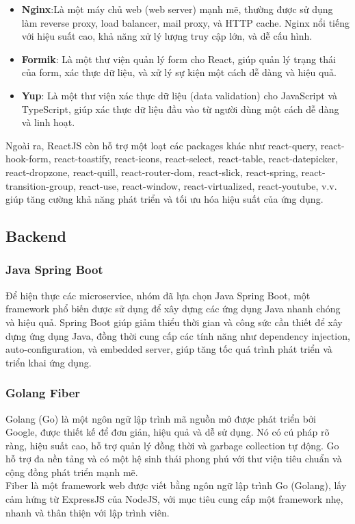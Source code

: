\begin{itemize}
    \item \textbf{Nginx}:Là một máy chủ web (web server) mạnh mẽ, thường được sử dụng làm reverse proxy, load balancer, mail proxy, và HTTP cache. Nginx nổi tiếng với hiệu suất cao, khả năng xử lý lượng truy cập lớn, và dễ cấu hình.
    \item \textbf{Formik}: Là một thư viện quản lý form cho React, giúp quản lý trạng thái của form, xác thực dữ liệu, và xử lý sự kiện một cách dễ dàng và hiệu quả.
    \item \textbf{Yup}: Là một thư viện xác thực dữ liệu (data validation) cho JavaScript và TypeScript, giúp xác thực dữ liệu đầu vào từ người dùng một cách dễ dàng và linh hoạt.
\end{itemize}
\noindent Ngoài ra, ReactJS còn hỗ trợ một loạt các packages khác như react-query, react-hook-form, react-toastify, react-icons, react-select, react-table, react-datepicker, react-dropzone, react-quill, react-router-dom, react-slick, react-spring, react-transition-group, react-use, react-window, react-virtualized, react-youtube, v.v. giúp tăng cường khả năng phát triển và tối ưu hóa hiệu suất của ứng dụng.
\subsection{Backend}
\subsubsection{Java Spring Boot}
\noindent Để hiện thực các microservice, nhóm đã lựa chọn Java Spring Boot, một framework phổ biến được sử dụng để xây dựng các ứng dụng Java nhanh chóng và hiệu quả. Spring Boot giúp giảm thiểu thời gian và công sức cần thiết để xây dựng ứng dụng Java, đồng thời cung cấp các tính năng như dependency injection, auto-configuration, và embedded server, giúp tăng tốc quá trình phát triển và triển khai ứng dụng.

\subsubsection{Golang Fiber}
\noindent Golang (Go) là một ngôn ngữ lập trình mã nguồn mở được phát triển bởi Google, được thiết kế để đơn giản, hiệu quả và dễ sử dụng. Nó có cú pháp rõ ràng, hiệu suất cao, hỗ trợ quản lý đồng thời và garbage collection tự động. Go hỗ trợ đa nền tảng và có một hệ sinh thái phong phú với thư viện tiêu chuẩn và cộng đồng phát triển mạnh mẽ.\\[0.5cm]
\noindent Fiber là một framework web được viết bằng ngôn ngữ lập trình Go (Golang), lấy cảm hứng từ ExpressJS của NodeJS, với mục tiêu cung cấp một framework nhẹ, nhanh và thân thiện với lập trình viên.
